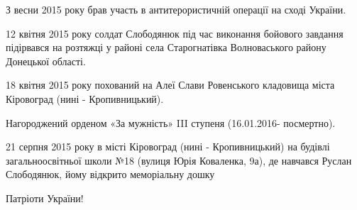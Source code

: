 З весни 2015 року брав участь в антитерористичній операції на сході України.

12 квітня 2015 року солдат Слободянюк під час виконання бойового завдання
підірвався на розтяжці у районі села Старогнатівка Волноваського району
Донецької області.

18 квітня 2015 року похований на Алеї Слави Ровенського кладовища міста
Кіровоград (нині - Кропивницький).

Нагороджений орденом «За мужність» III ступеня (16.01.2016- посмертно).

21 серпня 2015 року в місті Кіровоград (нині - Кропивницький) на будівлі
загальноосвітньої школи №18 (вулиця Юрія Коваленка, 9а), де навчався Руслан
Слободянюк, йому відкрито меморіальну дошку

Патріоти України!
